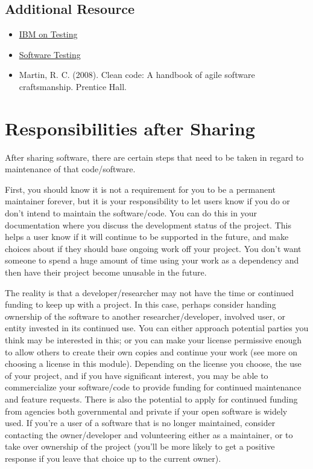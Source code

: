 \documentclass[
  letterpaper,
  DIV=11,
  numbers=noendperiod]{scrreport}
\providecommand{\tightlist}{%
  \setlength{\itemsep}{0pt}\setlength{\parskip}{0pt}}\usepackage{longtable,booktabs,array}
\begin{document}
\hypertarget{additional-resource}{%
\subsection{Additional Resource}\label{additional-resource}}

\begin{itemize}
\tightlist
\item
  \href{https://www.ibm.com/topics/software-testing}{IBM on Testing}
\item
  \href{https://www.softwaretestinghelp.com/types-of-software-testing/}{Software
  Testing}
\item
  Martin, R. C. (2008). Clean code: A handbook of agile software
  craftsmanship. Prentice Hall.
\end{itemize}

\hypertarget{responsibilities-after-sharing}{%
\section{Responsibilities after
Sharing}\label{responsibilities-after-sharing}}

After sharing software, there are certain steps that need to be taken in
regard to maintenance of that code/software.

First, you should know it is not a requirement for you to be a permanent
maintainer forever, but it is your responsibility to let users know if
you do or don't intend to maintain the software/code. You can do this in
your documentation where you discuss the development status of the
project. This helps a user know if it will continue to be supported in
the future, and make choices about if they should base ongoing work off
your project. You don't want someone to spend a huge amount of time
using your work as a dependency and then have their project become
unusable in the future.

The reality is that a developer/researcher may not have the time or
continued funding to keep up with a project. In this case, perhaps
consider handing ownership of the software to another
researcher/developer, involved user, or entity invested in its continued
use. You can either approach potential parties you think may be
interested in this; or you can make your license permissive enough to
allow others to create their own copies and continue your work (see more
on choosing a license in this module). Depending on the license you
choose, the use of your project, and if you have significant interest,
you may be able to commercialize your software/code to provide funding
for continued maintenance and feature requests. There is also the
potential to apply for continued funding from agencies both governmental
and private if your open software is widely used. If you're a user of a
software that is no longer maintained, consider contacting the
owner/developer and volunteering either as a maintainer, or to take over
ownership of the project (you'll be more likely to get a positive
response if you leave that choice up to the current owner).
\end{document}

